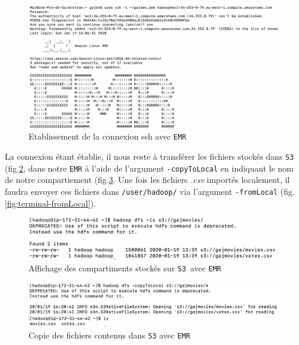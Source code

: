 \documentclass[a4paper, 12pt, oneside]{book}
\begin{document}
\begin{figure}[H]
  \centering
  \includegraphics[width=1.0\textwidth]{images/terminal-connexion}
  \caption{Etablissement de la connexion ssh avec \texttt{EMR}}
  \label{fig:terminal-connexion}
\end{figure}

La connexion étant établie, il nous reste à transférer les fichiers stockés dans \texttt{S3} (fig.\ref{fig:terminal-s3}, dans notre \texttt{EMR} à l'aide de l'argument \texttt{-copyToLocal} en indiquant le nom de notre compartiement (fig.\ref{fig:terminal-toLocal}. Une fois les fichiers \textit{.csv} importés localement, il faudra envoyer ces fichiers dans \texttt{/user/hadoop/} via l'argument \texttt{-fromLocal} (fig.\ref{fig:terminal-fromLocal}).

\begin{figure}[H]
  \centering
  \includegraphics[width=1.0\textwidth]{images/terminal-s3}
  \caption{Affichage des compartiments stockés sur \texttt{S3} avec \texttt{EMR}}
  \label{fig:terminal-s3}
\end{figure}

\begin{figure}[H]
  \centering
  \includegraphics[width=1.0\textwidth]{images/terminal-toLocal}
  \caption{Copie des fichiers contenus dans \texttt{S3} avec \texttt{EMR}}
  \label{fig:terminal-toLocal}
\end{figure}
\end{document}
